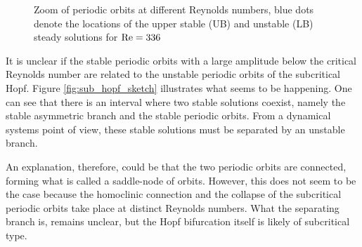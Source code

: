 \begin{figure}[!htb]
  \caption{Zoom of periodic orbits at different Reynolds numbers, blue dots
    denote the locations of the upper stable (UB) and unstable (LB) steady
    solutions for $\mathrm{Re} = 336$}
  \label{fig:orbits_zoom}
\end{figure}

It is unclear if the stable periodic orbits with a large amplitude below the
critical Reynolds number are related to the unstable periodic orbits of the
subcritical Hopf. Figure \ref{fig:sub_hopf_sketch} illustrates what seems to be
happening. One can see that there is an interval where two stable solutions
coexist, namely the stable asymmetric branch and the stable periodic orbits.
From a dynamical systems point of view, these stable solutions must be
separated by an unstable branch. 

An explanation, therefore, could be that the two periodic orbits are connected,
forming what is called a saddle-node of orbits. However, this does not seem to
be the case because the homoclinic connection and the collapse of the
subcritical periodic orbits take place at distinct Reynolds numbers. What the
separating branch is, remains unclear, but the Hopf bifurcation itself is
likely of subcritical type.

